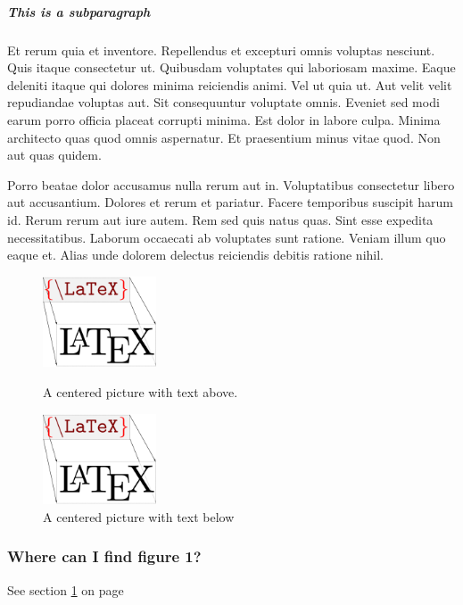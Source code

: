 \subparagraph{This is a subparagraph}
Et rerum quia et inventore. Repellendus et excepturi omnis voluptas nesciunt. Quis itaque consectetur ut.
Quibusdam voluptates qui laboriosam maxime. Eaque deleniti itaque qui dolores minima reiciendis animi. Vel ut quia ut. Aut velit velit repudiandae voluptas aut.
Sit consequuntur voluptate omnis. Eveniet sed modi earum porro officia placeat corrupti minima. Est dolor in labore culpa. Minima architecto quas quod omnis aspernatur. Et praesentium minus vitae quod. Non aut quas quidem.

Porro beatae dolor accusamus nulla rerum aut in. Voluptatibus consectetur libero aut accusantium. Dolores et rerum et pariatur. Facere temporibus suscipit harum id. Rerum rerum aut iure autem.
Rem sed quis natus quas. Sint esse expedita necessitatibus. Laborum occaecati ab voluptates sunt ratione. Veniam illum quo eaque et. Alias unde dolorem delectus reiciendis debitis ratione nihil.


\begin{figure}[ht]
  \caption{A centered picture with text above.}
  \centering
    \includegraphics[width=0.3\textwidth]{typeset-your-document-in-latex.png}
    \label{sub:ran}
\end{figure}

\begin{figure}[ht]
  \centering
      \includegraphics[width=0.3\textwidth]{typeset-your-document-in-latex.png}
  \caption{A centered picture with text below}
  
\end{figure}

\subsubsection{Where can I find figure 1?}
See section \ref{sub:ran} on page \pageref{sub:ran}